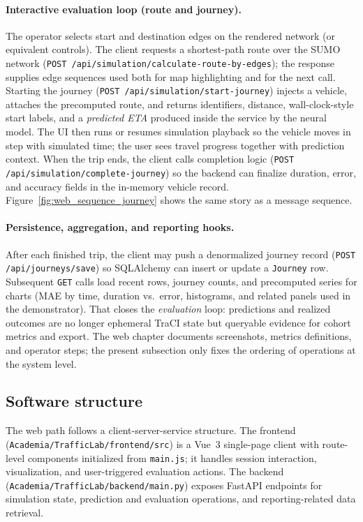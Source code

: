 \paragraph{Interactive evaluation loop (route and journey).}
\begin{sloppypar}
The operator selects start and destination edges on the rendered network (or equivalent controls). The client requests a shortest-path route over the SUMO network (\texttt{POST /api/simulation/calculate-route-by-edges}); the response supplies edge sequences used both for map highlighting and for the next call. Starting the journey (\texttt{POST /api/simulation/start-journey}) injects a vehicle, attaches the precomputed route, and returns identifiers, distance, wall-clock-style start labels, and a \emph{predicted ETA} produced inside the service by the neural model. The UI then runs or resumes simulation playback so the vehicle moves in step with simulated time; the user sees travel progress together with prediction context. When the trip ends, the client calls completion logic (\texttt{POST /api/simulation/complete-journey}) so the backend can finalize duration, error, and accuracy fields in the in-memory vehicle record. Figure~\ref{fig:web_sequence_journey} shows the same story as a message sequence.
\end{sloppypar}

\paragraph{Persistence, aggregation, and reporting hooks.}
After each finished trip, the client may push a denormalized journey record (\texttt{POST /api/journeys/save}) so SQLAlchemy can insert or update a \texttt{Journey} row. Subsequent \texttt{GET} calls load recent rows, journey counts, and precomputed series for charts (MAE by time, duration vs.\ error, histograms, and related panels used in the demonstrator). That closes the \emph{evaluation} loop: predictions and realized outcomes are no longer ephemeral TraCI state but queryable evidence for cohort metrics and export. The web chapter documents screenshots, metrics definitions, and operator steps; the present subsection only fixes the ordering of operations at the system level.

\subsection{Software structure}\label{sec:system:web:structure}
\begin{sloppypar}
The web path follows a client-server-service structure. The frontend (\texttt{Academia/TrafficLab/frontend/src}) is a Vue~3 single-page client with route-level components initialized from \texttt{main.js}; it handles session interaction, visualization, and user-triggered evaluation actions. The backend (\texttt{Academia/TrafficLab/backend/main.py}) exposes FastAPI endpoints for simulation state, prediction and evaluation operations, and reporting-related data retrieval.
\end{sloppypar}

